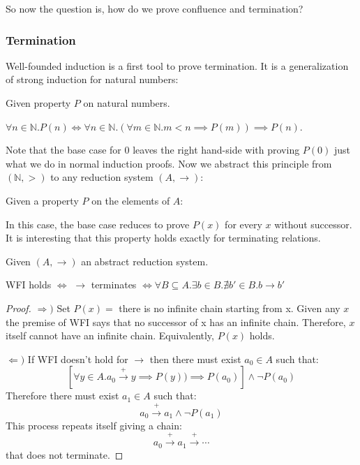 So now the question is, how do we prove confluence and termination?

\subsubsection{Termination}

Well-founded induction is a first tool to prove termination. It is a generalization of strong induction for natural numbers:

\begin{definition}
Given property $P$ on natural numbers. 

$\forall n \in \mathbb{N}. P(n) \iff \forall n \in \mathbb{N}. (\forall m \in \mathbb{N}. m < n \implies P(m)) \implies P(n)$.
\end{definition}

Note that the base case for $0$ leaves the right hand-side with proving $P(0)$ just what we do in normal induction proofs. Now we abstract this principle from $(\mathbb{N},>)$ to any reduction system $(A,\to)$:

\begin{definition}
Given a property $P$ on the elements of $A$:\\

\end{definition}

In this case, the base case reduces to prove $P(x)$ for every $x$ without successor. It is interesting that this property holds exactly for terminating relations.

\begin{theorem}
Given $(A,\to)$ an abstract reduction system. 

WFI holds $\iff$ $\to$ terminates $\iff \forall B \subseteq A.\exists b \in B. \nexists b' \in B.b \to b'$
\end{theorem}
\begin{proof}
$\Rightarrow)$ Set $P(x) = $ there is no infinite chain starting from x. Given any $x$ the premise of WFI says that no successor of x has an infinite chain. Therefore, $x$ itself cannot have an infinite chain. Equivalently, $P(x)$ holds. 

$\Leftarrow)$ If WFI doesn't hold for $\to$ then there must exist $a_0 \in A$ such that: $$[\forall y \in A. a_0  \stackrel{+}{\rightarrow} y \implies P(y)) \implies P(a_0)] \land \lnot P(a_0)$$ Therefore there must exist $a_1 \in A$ such that: $$a_0 \stackrel{+}{\rightarrow} a_1 \land \lnot P(a_1)$$ This process repeats itself giving a chain: $$a_0 \stackrel{+}{\rightarrow} a_1 \stackrel{+}{\rightarrow} \cdots$$ that does not terminate.
\end{proof}

